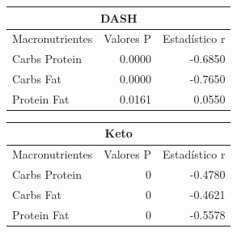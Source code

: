 \documentclass[12pt,a4paper]{article}
\begin{document}
{{            \begin{minipage}{0.5\textwidth}
                \centering                
                \begin{tabular}{lrr}
                    \toprule
                    \multicolumn{3}{c}{DASH}\\
                    \midrule
                        Macronutrientes & Valores P & Estadístico r \\
                    \midrule
                        Carbs Protein & 0.0000 & -0.6850 \\
                        Carbs Fat     & 0.0000 & -0.7650 \\
                        Protein Fat   & 0.0161 &  0.0550 \\
                    \bottomrule
                \end{tabular}
            \end{minipage}%
            \begin{minipage}{0.5\textwidth}
                \centering                
                \begin{tabular}{lrr}
                    \toprule
                    \multicolumn{3}{c}{Keto}\\
                    \midrule
                        Macronutrientes & Valores P & Estadístico r \\
                    \midrule
                        Carbs Protein & 0 & -0.4780 \\
                        Carbs Fat     & 0 & -0.4621 \\
                        Protein Fat   & 0 & -0.5578 \\
                    \bottomrule
                \end{tabular}
            \end{minipage}\\
            \newline 
            
}}
\end{document}
